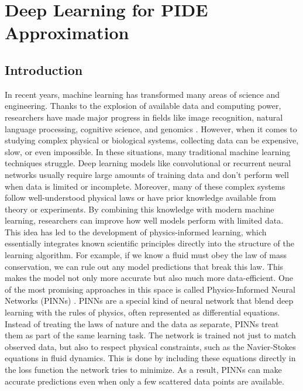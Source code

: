 \documentclass[11pt,twoside,openright]{report}
\begin{document}
\chapter{Deep Learning for PIDE Approximation}
\label{ch:deep_learning_for_pide_approximation}

\section{Introduction}
\label{sec:Resources}

In recent years, machine learning has transformed many areas of science and engineering. Thanks to the explosion of available data and computing power, researchers have made major progress in fields like image recognition, natural language processing, cognitive science, and genomics \cite{abadi2016tensorflow}. However, when it comes to studying complex physical or biological systems, collecting data can be expensive, slow, or even impossible. In these situations, many traditional machine learning techniques struggle. Deep learning models like convolutional or recurrent neural networks usually require large amounts of training data and don’t perform well when data is limited or incomplete.
Moreover, many of these complex systems follow well-understood physical laws or have prior knowledge available from theory or experiments. By combining this knowledge with modern machine learning, researchers can improve how well models perform with limited data. This idea has led to the development of physics-informed learning, which essentially integrates known scientific principles directly into the structure of the learning algorithm. For example, if we know a fluid must obey the law of mass conservation, we can rule out any model predictions that break this law. This makes the model not only more accurate but also much more data-efficient.
One of the most promising approaches in this space is called Physics-Informed Neural Networks (PINNs) \cite{raissi2019physics}. PINNs are a special kind of neural network that blend deep learning with the rules of physics, often represented as differential equations. Instead of treating the laws of nature and the data as separate, PINNs treat them as part of the same learning task. The network is trained not just to match observed data, but also to respect physical constraints, such as the Navier-Stokes equations in fluid dynamics. This is done by including these equations directly in the loss function the network tries to minimize. As a result, PINNs can make accurate predictions even when only a few scattered data points are available.
\end{document}
